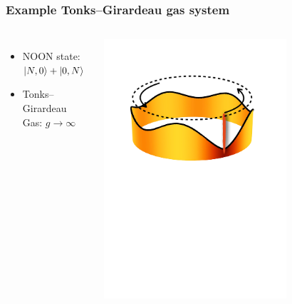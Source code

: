 \documentclass{beamer}
\begin{document}
\begin{frame}
\frametitle{Example Tonks--Girardeau gas system}

\begin{columns}
\begin{itemize}
\item NOON state: $\ket{N,0}+\ket{0,N}$

\item Tonks--Girardeau Gas: $g \rightarrow \infty$
\end{itemize}
\begin{center}
\includegraphics[width = 0.7\textwidth]{../data/1d/scheme.pdf}
\end{center}
\end{columns}

\pause


\end{frame}
\end{document}
